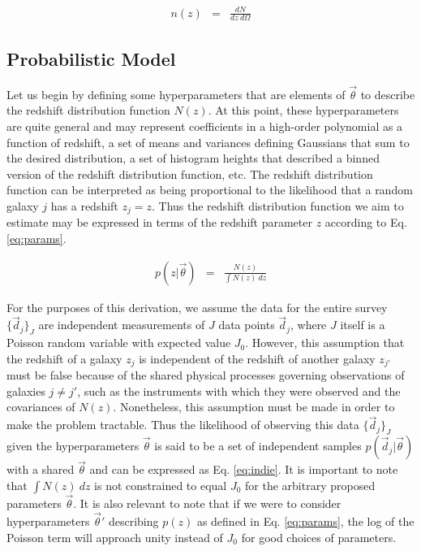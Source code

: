 \documentclass[preprint]{aastex}
\begin{document}
\begin{eqnarray}
\label{eq:density}
n(z) &=& \frac{dN}{dz\ d\Omega}
\end{eqnarray}

\subsection{Probabilistic Model}
\label{sec:prob}

Let us begin by defining some hyperparameters that are elements of $\vec{\theta}$ to describe the redshift distribution function $N(z)$.  At this point, these hyperparameters are quite general and may represent coefficients in a high-order polynomial as a function of redshift, a set of means and variances defining Gaussians that sum to the desired distribution, a set of histogram heights that described a binned version of the redshift distribution function, etc.  The redshift distribution function can be interpreted as being proportional to the likelihood that a random galaxy $j$ has a redshift $z_{j}=z$.  Thus the redshift distribution function we aim to estimate may be expressed in terms of the redshift parameter $z$ according to Eq. \ref{eq:params}.

\begin{eqnarray}
\label{eq:params}
p(z|\vec{\theta}) &=& \frac{N(z)}{\int N(z)\ dz}
\end{eqnarray}

For the purposes of this derivation, we assume the data for the entire survey $\{\vec{d}_{j}\}_{J}$ are independent measurements of $J$ data points $\vec{d}_{j}$, where $J$ itself is a Poisson random variable with expected value $J_{0}$.  However, this assumption that the redshift of a galaxy $z_{j}$ is independent of the redshift of another galaxy $z_{j'}$ must be false because of the shared physical processes governing observations of galaxies $j\neq j'$, such as the instruments with which they were observed and the covariances of $N(z)$.  Nonetheless, this assumption must be made in order to make the problem tractable.  Thus the likelihood of observing this data $\{\vec{d}_{j}\}_{J}$ given the hyperparameters $\vec{\theta}$ is said to be a set of independent samples $p(\vec{d}_{j}|\vec{\theta})$ with a shared $\vec{\theta}$ and can be expressed as Eq. \ref{eq:indie}.  \citep{for14}  It is important to note that $\int N(z)\ dz$ is not constrained to equal $J_{0}$ for the arbitrary proposed parameters $\vec{\theta}$.  It is also relevant to note that if we were to consider hyperparameters $\vec{\theta}'$ describing $p(z)$ as defined in Eq. \ref{eq:params}, the log of the Poisson term will approach unity instead of $J_{0}$ for good choices of parameters.
\end{document}
